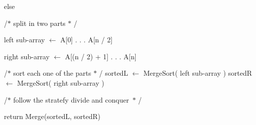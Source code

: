 \documentclass[12pt]{article}
\begin{document}
\begin{adjustwidth}{0.31in}{6.61in}
\begin{justify}
{\fontsize{11pt}{13.2pt}\selectfont else\par}
\end{justify}\par

\end{adjustwidth}

\begin{adjustwidth}{0.54in}{0.0in}
{\fontsize{11pt}{13.2pt}\selectfont /$\ast$  split in two parts  $\ast$ /\par}\par

\end{adjustwidth}

\begin{adjustwidth}{0.54in}{0.0in}
{\fontsize{11pt}{13.2pt}\selectfont left sub-array $ \leftarrow $  A[0] . . . A[n / 2]\par}\par

\end{adjustwidth}

\begin{adjustwidth}{0.54in}{0.0in}
{\fontsize{11pt}{13.2pt}\selectfont right sub-array $ \leftarrow $  A[(n / 2) + 1] . . . A[n]\par}\par

\end{adjustwidth}

\begin{adjustwidth}{0.54in}{3.97in}
{\fontsize{11pt}{13.2pt}\selectfont /$\ast$  sort  each one of the parts  $\ast$ / sortedL $ \leftarrow $  MergeSort(  left sub-array ) sortedR $ \leftarrow $  MergeSort(  right sub-array )\par}\par

\end{adjustwidth}

\begin{adjustwidth}{0.54in}{0.0in}
{\fontsize{11pt}{13.2pt}\selectfont /$\ast$  follow the stratefy  divide and conquer\  $\ast$ /\par}\par

\end{adjustwidth}

\begin{adjustwidth}{0.54in}{0.0in}
{\fontsize{11pt}{13.2pt}\selectfont return Merge(sortedL, sortedR)\par}\par

\end{adjustwidth}
\end{document}
